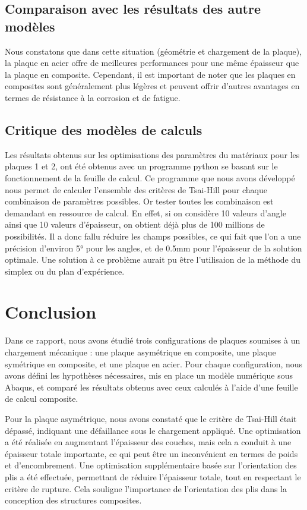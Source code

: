 \documentclass[a4paper,12pt]{article}
\begin{document}
\subsection{Comparaison avec les résultats des autre modèles}
Nous constatons que dans cette situation (géométrie et chargement de la plaque), la plaque en acier offre de meilleures performances pour une même épaisseur que la plaque en composite. Cependant, il est important de noter que les plaques en composites sont généralement plus légères et peuvent offrir d'autres avantages en termes de résistance à la corrosion et de fatigue.

\subsection{Critique des modèles de calculs}
Les résultats obtenus sur les optimisations des paramètres du matériaux pour les plaques 1 et 2, ont été obtenus avec un programme python se basant sur le fonctionnement de la feuille de calcul. Ce programme que nous avons développé nous permet de calculer l'ensemble des critères de Tsai-Hill pour chaque combinaison de paramètres possibles. Or tester toutes les combinaison est demandant en ressource de calcul. En effet, si on considère 10 valeurs d'angle ainsi que 10 valeurs d'épaisseur, on obtient déjà plus de 100 millions de possibilités. Il a donc fallu réduire les champs possibles, ce qui fait que l'on a une précision d'environ 5° pour les angles, et de 0.5mm pour l'épaisseur de la solution optimale. Une solution à ce problème aurait pu être l'utilisaion de la méthode du simplex ou du plan d'expérience.

\section{Conclusion}
Dans ce rapport, nous avons étudié trois configurations de plaques soumises à un chargement mécanique : une plaque asymétrique en composite, une plaque symétrique en composite, et une plaque en acier. Pour chaque configuration, nous avons défini les hypothèses nécessaires, mis en place un modèle numérique sous Abaqus, et comparé les résultats obtenus avec ceux calculés à l'aide d'une feuille de calcul composite.

Pour la plaque asymétrique, nous avons constaté que le critère de Tsai-Hill était dépassé, indiquant une défaillance sous le chargement appliqué. Une optimisation a été réalisée en augmentant l'épaisseur des couches, mais cela a conduit à une épaisseur totale importante, ce qui peut être un inconvénient en termes de poids et d'encombrement. Une optimisation supplémentaire basée sur l'orientation des plis a été effectuée, permettant de réduire l'épaisseur totale, tout en respectant le critère de rupture. Cela souligne l'importance de l'orientation des plis dans la conception des structures composites.
\end{document}
